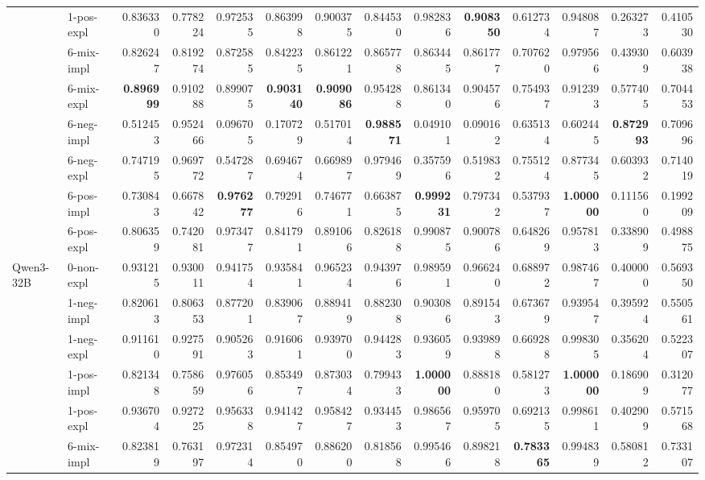 \begin{tabular}{ll|rrrr|rrrr|rrrr}
 & 1-pos-expl & 0.836330 & 0.778224 & 0.972535 & 0.863998 & 0.900375 & 0.844530 & 0.982836 & \bfseries 0.908350 & 0.612734 & 0.948087 & 0.263273 & 0.410530 \\
 & 6-mix-impl & 0.826247 & 0.819274 & 0.872585 & 0.842235 & 0.861221 & 0.865778 & 0.863445 & 0.861777 & 0.707620 & 0.979566 & 0.439309 & 0.603938 \\
 & 6-mix-expl & \bfseries 0.896999 & 0.910288 & 0.899075 & \bfseries 0.903140 & \bfseries 0.909086 & 0.954288 & 0.861340 & 0.904576 & 0.754937 & 0.912393 & 0.577405 & 0.704453 \\
 & 6-neg-impl & 0.512453 & 0.952466 & 0.096705 & 0.170729 & 0.517014 & \bfseries 0.988571 & 0.049101 & 0.090162 & 0.635134 & 0.602445 & \bfseries 0.872993 & 0.709696 \\
 & 6-neg-expl & 0.747195 & 0.969772 & 0.547287 & 0.694674 & 0.669897 & 0.979469 & 0.357596 & 0.519832 & 0.755124 & 0.877345 & 0.603932 & 0.714019 \\
 & 6-pos-impl & 0.730843 & 0.667842 & \bfseries 0.976277 & 0.792916 & 0.746771 & 0.663875 & \bfseries 0.999231 & 0.797342 & 0.537937 & \bfseries 1.000000 & 0.111560 & 0.199209 \\
 & 6-pos-expl & 0.806359 & 0.742081 & 0.973477 & 0.841791 & 0.891066 & 0.826188 & 0.990875 & 0.900786 & 0.648269 & 0.957813 & 0.338909 & 0.498875 \\
 \midrule
\multirow[c]{11}{*}{Qwen3-32B} & 0-non-expl & 0.931215 & 0.930011 & 0.941754 & 0.935841 & 0.965234 & 0.943976 & 0.989591 & 0.966240 & 0.688972 & 0.987467 & 0.400000 & 0.569350 \\
 & 1-neg-impl & 0.820613 & 0.806353 & 0.877201 & 0.839067 & 0.889419 & 0.882308 & 0.903086 & 0.891543 & 0.673679 & 0.939547 & 0.395924 & 0.550561 \\
 & 1-neg-expl & 0.911610 & 0.927591 & 0.905263 & 0.916061 & 0.939700 & 0.944283 & 0.936059 & 0.939898 & 0.669288 & 0.998305 & 0.356204 & 0.522307 \\
 & 1-pos-impl & 0.821348 & 0.758659 & 0.976056 & 0.853497 & 0.873034 & 0.799433 & \bfseries 1.000000 & 0.888180 & 0.581273 & \bfseries 1.000000 & 0.186909 & 0.312077 \\
 & 1-pos-expl & 0.936704 & 0.927225 & 0.956338 & 0.941427 & 0.958427 & 0.934453 & 0.986567 & 0.959705 & 0.692135 & 0.998611 & 0.402909 & 0.571568 \\
 & 6-mix-impl & 0.823819 & 0.763197 & 0.972314 & 0.854970 & 0.886200 & 0.818568 & 0.995466 & 0.898218 & \bfseries 0.783365 & 0.994839 & 0.580812 & 0.733107 \\

\end{tabular}
